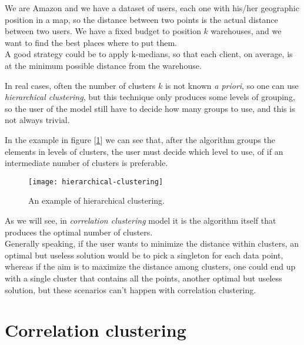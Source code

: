 \begin{ex}
    We are Amazon and we have a dataset of users, each one with his/her geographic position in a map, so the distance between two points is the actual distance between two users. We have a fixed budget to position $k$ warehouses, and we want to find the best places where to put them.\\
    A good strategy could be to apply k-medians, so that each client, on average, is at the minimum possible distance from the warehouse.
\end{ex}

In real cases, often the number of clusters $k$ is not known \textit{a priori}, so one can use \textit{hierarchical clustering}, but this technique only produces some levels of grouping, so the user of the model still have to decide how many groups to use, and this is not always trivial.

\begin{ex}
    In the example in figure [\ref{fig:hierarchical-clustering-ex}] we can see that, after the algorithm groups the elements in levels of clusters, the user must decide which level to use, of if an intermediate number of clusters is preferable.
    
    \begin{figure}
        \centering
        \texttt{[image: hierarchical-clustering]}
        \caption{An example of hierarchical clustering.}
        \label{fig:hierarchical-clustering-ex}
    \end{figure}
\end{ex}

As we will see, in \textit{correlation clustering} model it is the algorithm itself that produces the optimal number of clusters.\\ Generally speaking, if the user wants to minimize the distance within clusters, an optimal but useless solution would be to pick a singleton for each data point, whereas if the aim is to maximize the distance among clusters, one could end up with a single cluster that contains all the points, another optimal but useless solution, but these scenarios can't happen with correlation clustering.


\section{Correlation clustering}\label{sec:corr-clust}

